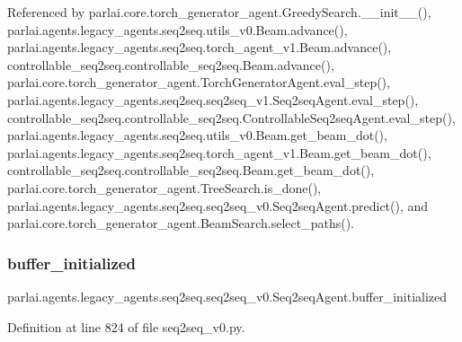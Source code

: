 Referenced by parlai.\+core.\+torch\+\_\+generator\+\_\+agent.\+Greedy\+Search.\+\_\+\+\_\+init\+\_\+\+\_\+(), parlai.\+agents.\+legacy\+\_\+agents.\+seq2seq.\+utils\+\_\+v0.\+Beam.\+advance(), parlai.\+agents.\+legacy\+\_\+agents.\+seq2seq.\+torch\+\_\+agent\+\_\+v1.\+Beam.\+advance(), controllable\+\_\+seq2seq.\+controllable\+\_\+seq2seq.\+Beam.\+advance(), parlai.\+core.\+torch\+\_\+generator\+\_\+agent.\+Torch\+Generator\+Agent.\+eval\+\_\+step(), parlai.\+agents.\+legacy\+\_\+agents.\+seq2seq.\+seq2seq\+\_\+v1.\+Seq2seq\+Agent.\+eval\+\_\+step(), controllable\+\_\+seq2seq.\+controllable\+\_\+seq2seq.\+Controllable\+Seq2seq\+Agent.\+eval\+\_\+step(), parlai.\+agents.\+legacy\+\_\+agents.\+seq2seq.\+utils\+\_\+v0.\+Beam.\+get\+\_\+beam\+\_\+dot(), parlai.\+agents.\+legacy\+\_\+agents.\+seq2seq.\+torch\+\_\+agent\+\_\+v1.\+Beam.\+get\+\_\+beam\+\_\+dot(), controllable\+\_\+seq2seq.\+controllable\+\_\+seq2seq.\+Beam.\+get\+\_\+beam\+\_\+dot(), parlai.\+core.\+torch\+\_\+generator\+\_\+agent.\+Tree\+Search.\+is\+\_\+done(), parlai.\+agents.\+legacy\+\_\+agents.\+seq2seq.\+seq2seq\+\_\+v0.\+Seq2seq\+Agent.\+predict(), and parlai.\+core.\+torch\+\_\+generator\+\_\+agent.\+Beam\+Search.\+select\+\_\+paths().

\mbox{\label{classparlai_1_1agents_1_1legacy__agents_1_1seq2seq_1_1seq2seq__v0_1_1Seq2seqAgent_a31e1353ee2c64ac03af2bc7854597f35}} 
\subsubsection{\texorpdfstring{buffer\+\_\+initialized}{buffer\_initialized}}
{\footnotesize\ttfamily parlai.\+agents.\+legacy\+\_\+agents.\+seq2seq.\+seq2seq\+\_\+v0.\+Seq2seq\+Agent.\+buffer\+\_\+initialized}



Definition at line 824 of file seq2seq\+\_\+v0.\+py.

\mbox{\label{classparlai_1_1agents_1_1legacy__agents_1_1seq2seq_1_1seq2seq__v0_1_1Seq2seqAgent_a4896d5dc3fd7a0f876a654f0bc942b6a}} 
